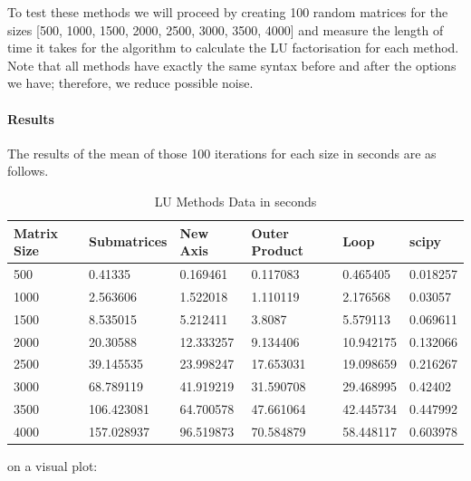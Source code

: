 To test these methods we will proceed by creating 100 random matrices for the sizes [500, 1000, 1500, 2000, 2500, 3000, 3500, 4000] and measure the length of time it takes for the algorithm to calculate the LU factorisation for each method. Note that all methods have exactly the same syntax before and after the options we have; therefore, we reduce possible noise.
\paragraph{Results}
The results of the mean of those 100 iterations for each size in seconds are as follows. 
\begin{table}[H]
    \centering
    \begin{tabular}{|l|l|l|l|l|l|}
    \hline
        \textbf{Matrix Size} & \textbf{Submatrices} & \textbf{New Axis} & \textbf{Outer Product} & \textbf{Loop} & \textbf{scipy} \\ \hline
        500 & 0.41335 & 0.169461 & 0.117083 & 0.465405 & 0.018257 \\ \hline
        1000 & 2.563606 & 1.522018 & 1.110119 & 2.176568 & 0.03057 \\ \hline
        1500 & 8.535015 & 5.212411 & 3.8087 & 5.579113 & 0.069611 \\ \hline
        2000 & 20.30588 & 12.333257 & 9.134406 & 10.942175 & 0.132066 \\ \hline
        2500 & 39.145535 & 23.998247 & 17.653031 & 19.098659 & 0.216267 \\ \hline
        3000 & 68.789119 & 41.919219 & 31.590708 & 29.468995 & 0.42402 \\ \hline
        3500 & 106.423081 & 64.700578 & 47.661064 & 42.445734 & 0.447992 \\ \hline
        4000 & 157.028937 & 96.519873 & 70.584879 & 58.448117 & 0.603978 \\ \hline
    \end{tabular}
    \caption{LU Methods Data in seconds}
\end{table}

on a visual plot:

